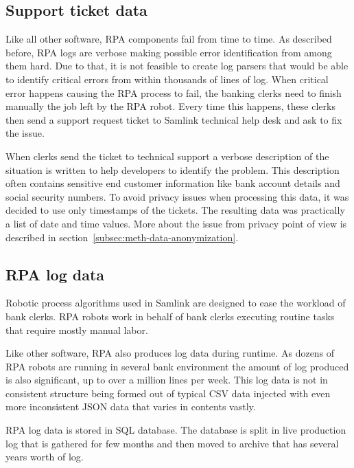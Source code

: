 \subsection{Support ticket data}\label{subsec:meth-efecte-ticket-data}

Like all other software,
RPA components fail from time to time.
As described before,
RPA logs are verbose
making possible error identification from among them hard.
Due to that,
it is not feasible to create log parsers
that would be able to identify critical errors
from within thousands of lines of log.
When critical error happens
causing the RPA process to fail,
the banking clerks need to finish manually
the job left by the RPA robot.
Every time this happens,
these clerks then send a support request ticket
to Samlink technical help desk
and ask to fix the issue.

When clerks send the ticket to technical support
a verbose description of the situation is written
to help developers to identify the problem.
This description often contains sensitive end customer information
like bank account details and social security numbers.
To avoid privacy issues when processing this data,
it was decided to use only timestamps of the tickets.
The resulting data was practically a list of date and time values.
More about the issue from privacy point of view
is described in section~\ref{subsec:meth-data-anonymization}.


\subsection{RPA log data}\label{subsec:meth-rpa-log-data}
Robotic process algorithms used in Samlink
are designed to ease the workload of bank clerks.
RPA robots work in behalf of bank clerks
executing routine tasks that require mostly manual labor.

Like other software,
RPA also produces log data during runtime.
As dozens of RPA robots are running
in several bank environment
the amount of log produced is also significant,
up to over a million lines per week.
This log data is not in consistent structure
being formed out of typical CSV data
injected with even more inconsistent JSON data
that varies in contents vastly.

RPA log data is stored in SQL database.
The database is split in live production log
that is gathered for few months
and then moved to archive that has
several years worth of log.

